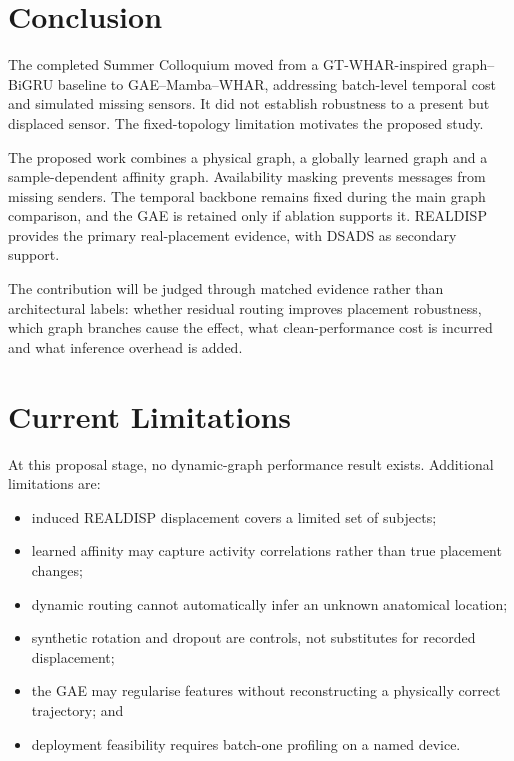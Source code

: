\documentclass[12pt,a4paper,twoside,openright]{report}
\begin{document}
\section{Conclusion}
The completed Summer Colloquium moved from a GT-WHAR-inspired graph--BiGRU baseline to GAE--Mamba--WHAR, addressing batch-level temporal cost and simulated missing sensors. It did not establish robustness to a present but displaced sensor. The fixed-topology limitation motivates the proposed study.

The proposed work combines a physical graph, a globally learned graph and a sample-dependent affinity graph. Availability masking prevents messages from missing senders. The temporal backbone remains fixed during the main graph comparison, and the GAE is retained only if ablation supports it. REALDISP provides the primary real-placement evidence, with DSADS as secondary support.

The contribution will be judged through matched evidence rather than architectural labels: whether residual routing improves placement robustness, which graph branches cause the effect, what clean-performance cost is incurred and what inference overhead is added.

\section{Current Limitations}
At this proposal stage, no dynamic-graph performance result exists. Additional limitations are:
\begin{itemize}
\item induced REALDISP displacement covers a limited set of subjects;
\item learned affinity may capture activity correlations rather than true placement changes;
\item dynamic routing cannot automatically infer an unknown anatomical location;
\item synthetic rotation and dropout are controls, not substitutes for recorded displacement;
\item the GAE may regularise features without reconstructing a physically correct trajectory; and
\item deployment feasibility requires batch-one profiling on a named device.
\end{itemize}
\end{document}

